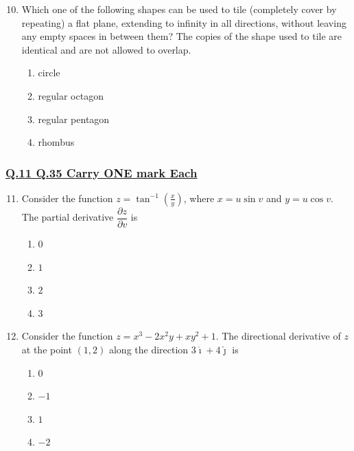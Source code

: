 \documentclass[journal]{IEEEtran}
\theoremstyle{remark}
\begin{document}
\begin{enumerate}[itemsep=1em]
\setcounter{enumi}{9}
\item  Which one of the following shapes can be used to tile (completely cover by repeating) a flat plane, extending to infinity in all directions, without leaving any empty spaces in between them? The copies of the shape used to tile are identical 
and are not allowed to overlap.
\begin{enumerate}[leftmargin=2.5em, labelsep=0.5em, itemsep=0.5em]
      \item circle
      \item regular octagon
      \item regular pentagon
      \item rhombus
\end{enumerate}

\end{enumerate}

\subsubsection{\underline{Q.11 \text{-} Q.35 Carry ONE mark Each}}

\begin{enumerate}[itemsep=1em]
\setcounter{enumi}{10}
\item Consider the function 
\( z = \tan^{-1}\!\left(\frac{x}{y}\right) \), 
where \( x = u \sin v \) and \( y = u \cos v \).  
The partial derivative \( \dfrac{\partial z}{\partial v} \) is 
\begin{multicols}{4}
\begin{enumerate}
     \item $0$
     \item $1$
     \item $2$
     \item $3$
\end{enumerate}
\end{multicols}

\end{enumerate}

\begin{enumerate}[itemsep=1em]
\setcounter{enumi}{11}
\item Consider the function \( z = x^{3} - 2x^{2}y + xy^{2} + 1 \).
The directional derivative of \(z\) at the point \((1,2)\) along the direction \(3\hat{\imath}+4\hat{\jmath}\) is 
\begin{multicols}{4}
\begin{enumerate}
      \item $0$
      \item $-1$
      \item $1$
      \item $-2$
\end{enumerate}
\end{multicols}

\end{enumerate}
\end{document}
